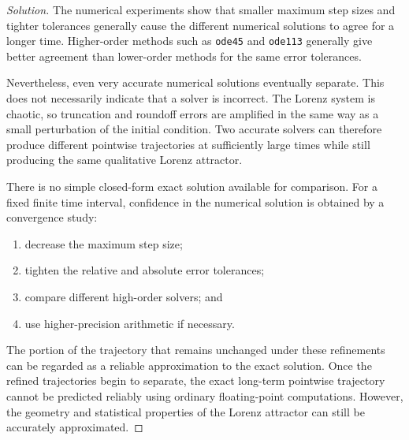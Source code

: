 \documentclass[12pt]{amsart}
\newenvironment{solution}
{\begin{proof}[Solution]}
{\end{proof}}
\begin{document}
\begin{onehalfspace}
\begin{solution}
            The numerical experiments show that smaller maximum step sizes and
            tighter tolerances generally cause the different numerical solutions
            to agree for a longer time. Higher-order methods such as
            \texttt{ode45} and \texttt{ode113} generally give better agreement than
            lower-order methods for the same error tolerances.

            Nevertheless, even very accurate numerical solutions eventually
            separate. This does not necessarily indicate that a solver is
            incorrect. The Lorenz system is chaotic, so truncation and roundoff
            errors are amplified in the same way as a small perturbation of the
            initial condition. Two accurate solvers can therefore produce
            different pointwise trajectories at sufficiently large times while
            still producing the same qualitative Lorenz attractor.

            There is no simple closed-form exact solution available for comparison.
            For a fixed finite time interval, confidence in the numerical solution
            is obtained by a convergence study:

            \begin{enumerate}
                \item decrease the maximum step size;
                \item tighten the relative and absolute error tolerances;
                \item compare different high-order solvers; and
                \item use higher-precision arithmetic if necessary.
            \end{enumerate}

            The portion of the trajectory that remains unchanged under these
            refinements can be regarded as a reliable approximation to the exact
            solution. Once the refined trajectories begin to separate, the exact
            long-term pointwise trajectory cannot be predicted reliably using
            ordinary floating-point computations. However, the geometry and
            statistical properties of the Lorenz attractor can still be accurately
            approximated.

        \end{solution}

    \end{onehalfspace}
\end{document}
